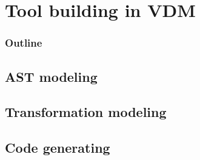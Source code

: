 %
%
\section{Tool building in VDM}
%
%
\begin{frame}
  \frametitle{Outline}
  \tableofcontents[current]
\end{frame}



\subsection{AST modeling}



\subsection{Transformation modeling}



\subsection{Code generating}
